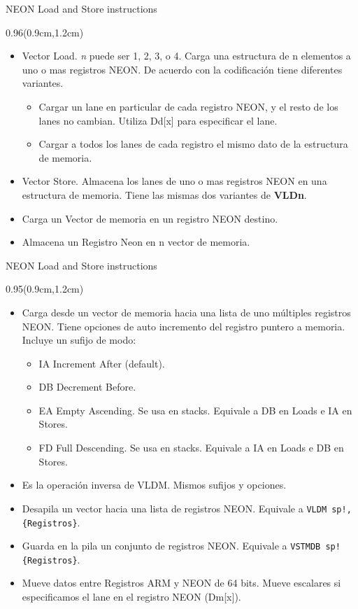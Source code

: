\begin{frame}{NEON Load and Store instructions}
 \begin{textblock*}{0.96\textwidth}(0.9cm,1.2cm)
  \begin{itemize}\justifying
   \item [VLDn] Vector Load. \textit{n} puede ser 1, 2, 3, o 4. Carga una estructura de n elementos a uno o mas registros NEON. De acuerdo con la codificación tiene diferentes variantes.
   \begin{itemize}
    \item Cargar un lane en particular de cada registro NEON, y el resto de los lanes no cambian. Utiliza Dd[x] para especificar el lane.
    \item Cargar a todos los lanes de cada registro el mismo dato de la estructura de memoria.
   \end{itemize}
   \item [VSTn] Vector Store. Almacena los lanes de uno o mas registros NEON en una estructura de memoria. Tiene las mismas dos variantes de \textbf{\color{blue}VLDn}.
   \item [VLDR] Carga un Vector de memoria en un registro NEON destino.
   \item [VSTR] Almacena un Registro Neon en n vector de memoria.
  \end{itemize}
 \end{textblock*}
\end{frame}

\begin{frame}{NEON Load and Store instructions}
 \begin{textblock*}{0.95\textwidth}(0.9cm,1.2cm)
  \begin{itemize}\justifying
   \item [VLDM] Carga desde un vector de memoria hacia una lista de uno múltiples registros NEON. Tiene opciones de auto incremento del registro puntero a memoria. Incluye un sufijo de modo:
   \begin{itemize}
    \item IA Increment After (default).
    \item DB Decrement Before.
    \item EA Empty Ascending. Se usa en stacks. Equivale a DB en Loads e IA en Stores.
    \item FD Full Descending. Se usa en stacks. Equivale a IA en Loads e DB en Stores.
   \end{itemize}
   \item [VSTM] Es la operación inversa de {\color{blue}VLDM}. Mismos sufijos y opciones.
   \item [VPOP] Desapila un vector hacia una lista de registros NEON. Equivale a \texttt{VLDM sp!, \{Registros\}}.
   \item [VPUSH] Guarda en la pila un conjunto de registros NEON. Equivale a \texttt{VSTMDB sp! \{Registros\}}.
   \item [VMOV] Mueve datos entre Registros ARM y NEON de 64 bits. Mueve escalares si especificamos el lane en el registro NEON (Dm[x]). 
  \end{itemize}
 \end{textblock*}
\end{frame}

